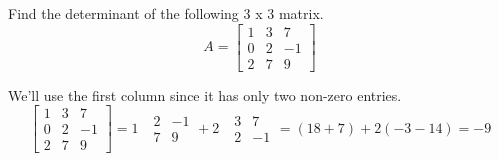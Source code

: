 \begin{example}
	Find the determinant of the following 3 x 3 matrix.
	\begin{equation*}
		A = \begin{bmatrix}
			1 & 3 & 7 \\
			0 & 2 & -1 \\
			2 & 7 & 9
		\end{bmatrix}
	\end{equation*}
\end{example}
We'll use the first column since it has only two non-zero entries.
\begin{equation*}
	\begin{bmatrix}
	1 & 3 & 7 \\
	0 & 2 & -1 \\
	2 & 7 & 9
	\end{bmatrix} = 1 \text{ } \begin{array}{|cc|}
		2 & -1 \\
		7 & 9
	\end{array} + 2 \text{ } \begin{array}{|cc|}
		3 & 7 \\
		2 & -1
	\end{array} = (18+7) + 2(-3-14) = -9
\end{equation*}